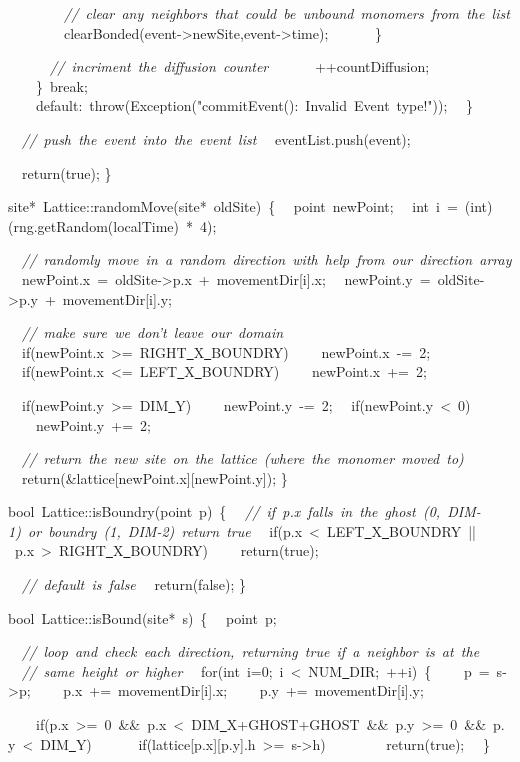 {\ \ \ \ \ \ \ \ \textsl{//\ clear\ any\ neighbors\ that\ could\ be\ unbound\ monomers\ from\ the\ list}
\ \ \ \ \ \ \ \ clearBonded(event-{}>{}newSite,event-{}>{}time);
\ \ \ \ \ \ \}

\ \ \ \ \ \ \textsl{//\ incriment\ the\ diffusion\ counter}
\ \ \ \ \ \ ++countDiffusion;
\ \ \ \ \}\ break;
\ \ \ \ default:\ throw(Exception("{}commitEvent():\ Invalid\ Event\ type!"{}));
\ \ \}

\ \ \textsl{//\ push\ the\ event\ into\ the\ event\ list}
\ \ eventList.push(event);

\ \ return(true);
\}

site*\ Lattice::randomMove(site*\ oldSite)\ \{
\ \ point\ newPoint;
\ \ int\ i\ =\ (int)(rng.getRandom(localTime)\ *\ 4);

\ \ \textsl{//\ randomly\ move\ in\ a\ random\ direction\ with\ help\ from\ our\ direction\ array}
\ \ newPoint.x\ =\ oldSite-{}>{}p.x\ +\ movementDir[i].x;
\ \ newPoint.y\ =\ oldSite-{}>{}p.y\ +\ movementDir[i].y;

\ \ \textsl{//\ make\ sure\ we\ don't\ leave\ our\ domain}
\ \ if(newPoint.x\ >{}=\ RIGHT\underline\ X\underline\ BOUNDRY)
\ \ \ \ newPoint.x\ -{}=\ 2;
\ \ if(newPoint.x\ <{}=\ LEFT\underline\ X\underline\ BOUNDRY)
\ \ \ \ newPoint.x\ +=\ 2;

\ \ if(newPoint.y\ >{}=\ DIM\underline\ Y)
\ \ \ \ newPoint.y\ -{}=\ 2;
\ \ if(newPoint.y\ <{}\ 0)
\ \ \ \ newPoint.y\ +=\ 2;

\ \ \textsl{//\ return\ the\ new\ site\ on\ the\ lattice\ (where\ the\ monomer\ moved\ to)}
\ \ return(\&lattice[newPoint.x][newPoint.y]);
\}

bool\ Lattice::isBoundry(point\ p)\ \{
\ \ \textsl{//\ if\ p.x\ falls\ in\ the\ ghost\ (0,\ DIM-{}1)\ or\ boundry\ (1,\ DIM-{}2)\ return\ true}
\ \ if(p.x\ <{}\ LEFT\underline\ X\underline\ BOUNDRY\ ||\ p.x\ >{}\ RIGHT\underline\ X\underline\ BOUNDRY)
\ \ \ \ return(true);

\ \ \textsl{//\ default\ is\ false}
\ \ return(false);
\}

bool\ Lattice::isBound(site*\ s)\ \{
\ \ point\ p;

\ \ \textsl{//\ loop\ and\ check\ each\ direction,\ returning\ true\ if\ a\ neighbor\ is\ at\ the}
\ \ \textsl{//\ same\ height\ or\ higher}
\ \ for(int\ i=0;\ i\ <{}\ NUM\underline\ DIR;\ ++i)\ \{
\ \ \ \ p\ =\ s-{}>{}p;
\ \ \ \ p.x\ +=\ movementDir[i].x;
\ \ \ \ p.y\ +=\ movementDir[i].y;

\ \ \ \ if(p.x\ >{}=\ 0\ \&\&\ p.x\ <{}\ DIM\underline\ X+GHOST+GHOST\ \&\&\ p.y\ >{}=\ 0\ \&\&\ p.y\ <{}\ DIM\underline\ Y)
\ \ \ \ \ \ if(lattice[p.x][p.y].h\ >{}=\ s-{}>{}h)
\ \ \ \ \ \ \ \ return(true);
\ \ \}

}
